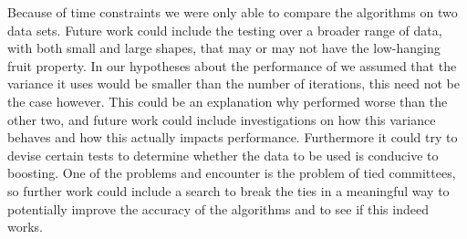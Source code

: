 \par Because of time constraints we were only able to compare the algorithms on two data sets. Future work could include the testing over a broader range of data, with both small and large shapes, that may or may not have the low-hanging fruit property. In our hypotheses about the performance of \squintB we assumed that the variance it uses would be smaller than the number of iterations, this need not be the case however. This could be an explanation why \squinB performed worse than the other two, and future work could include investigations on how this variance behaves and how this actually impacts performance. Furthermore it could try to devise certain tests to determine whether the data to be used is conducive to boosting. One of the problems \squintB and \NHB encounter is the problem of tied committees, so further work could include a search to break the ties in a meaningful way to potentially improve the accuracy of the algorithms and to see if this indeed works.
